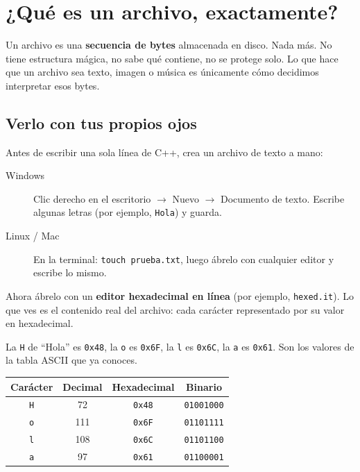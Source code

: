 \documentclass[12pt, oneside]{article}
\begin{document}
\section{¿Qué es un archivo, exactamente?}

Un archivo es una \textbf{secuencia de bytes} almacenada en disco.  Nada más.
No tiene estructura mágica, no sabe qué contiene, no se protege solo.  Lo que
hace que un archivo sea texto, imagen o música es únicamente cómo decidimos
interpretar esos bytes.

\subsection{Verlo con tus propios ojos}

Antes de escribir una sola línea de C++, crea un archivo de texto a mano:

\begin{description}
  \item[Windows] Clic derecho en el escritorio $\to$ Nuevo $\to$ Documento de texto.
        Escribe algunas letras (por ejemplo, \texttt{Hola}) y guarda.
  \item[Linux / Mac] En la terminal: \texttt{touch prueba.txt}, luego ábrelo
        con cualquier editor y escribe lo mismo.
\end{description}

Ahora ábrelo con un \textbf{editor hexadecimal en línea} (por ejemplo,
\texttt{hexed.it}).  Lo que ves es el contenido real del archivo: cada
carácter representado por su valor en hexadecimal.

La \texttt{H} de ``Hola'' es \texttt{0x48}, la \texttt{o} es \texttt{0x6F},
la \texttt{l} es \texttt{0x6C}, la \texttt{a} es \texttt{0x61}.  Son los
valores de la tabla ASCII que ya conoces.

\begin{center}
\begin{tabular}{cccc}
  \toprule
  \textbf{Carácter} & \textbf{Decimal} & \textbf{Hexadecimal} & \textbf{Binario} \\
  \midrule
  \texttt{H} & 72  & \texttt{0x48} & \texttt{01001000} \\
  \texttt{o} & 111 & \texttt{0x6F} & \texttt{01101111} \\
  \texttt{l} & 108 & \texttt{0x6C} & \texttt{01101100} \\
  \texttt{a} & 97  & \texttt{0x61} & \texttt{01100001} \\
  \bottomrule
\end{tabular}
\end{center}
\end{document}
